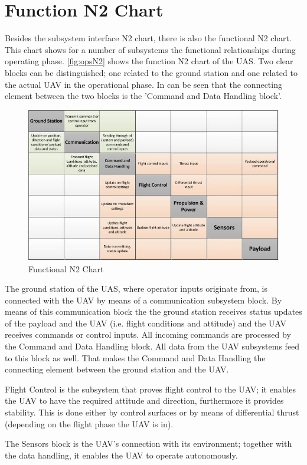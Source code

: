 \section{Function N2 Chart}
\label{sec:n2func}
Besides the subsystem interface N2 chart, there is also the functional N2 chart. This chart shows for a number of subsystems the functional relationships during operating phase. \autoref{fig:opsN2} shows the function N2 chart of the UAS. Two clear blocks can be distinguished; one related to the ground station and one related to the actual UAV in the operational phase. In can be seen that the connecting element between the two blocks is the 'Command and Data Handling block'.

\begin{figure}[htb]
\includegraphics[width=\textwidth]{./Interfaces/Figures/N2ops.jpg}
\caption{Functional N2 Chart}
\label{fig:opsN2}
\end{figure}

The ground station of the UAS, where operator inputs originate from, is connected with the UAV by means of a communication subsystem block. By means of this communication block the the ground station receives status updates of the payload and the UAV (i.e. flight conditions and attitude) and the UAV receives commands or control inputs. All incoming commands are processed by the Command and Data Handling block. All data from the UAV subsystems feed to this block as well. That makes the Command and Data Handling the connecting element between the ground station and the UAV.

Flight Control is the subsystem that proves flight control to the UAV; it enables the UAV to have the required attitude and direction, furthermore it provides stability. This is done either by control surfaces or by means of differential thrust (depending on the flight phase the UAV is in).

The Sensors block is the UAV's connection with its environment; together with the data handling, it enables the UAV to operate autonomously.




